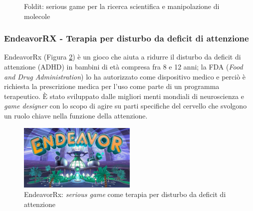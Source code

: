 \begin{figure} [h]
    \centering
    \caption{Foldit: serious game per la ricerca scientifica e manipolazione di molecole}
    \label{fig:foldit} 
\end{figure}

\subsubsection{EndeavorRX - Terapia per disturbo da deficit di attenzione}
EndeavorRx \cite{endeavorRx} (Figura \ref{fig:endeavorRx}) è un gioco che aiuta a ridurre il disturbo da deficit di attenzione (ADHD) in bambini di età compresa fra 8 e 12 anni; la FDA (\textit{Food and Drug Administration}) lo ha autorizzato come dispositivo medico e perciò è richiesta la prescrizione medica per l'uso come parte di un programma terapeutico.
\uppercase{è} stato sviluppato dalle migliori menti mondiali di neuroscienza e \textit{game designer} con lo scopo di agire su parti specifiche del cervello che svolgono un ruolo chiave nella funzione della attenzione.

\begin{figure} [h]
    \center
    \includegraphics[width=0.5\textwidth]{img/endeavorRx.jpg}
    \caption{EndeavorRx: \textit{serious game} come terapia per disturbo da deficit di attenzione}
    \label{fig:endeavorRx}
\end{figure}

